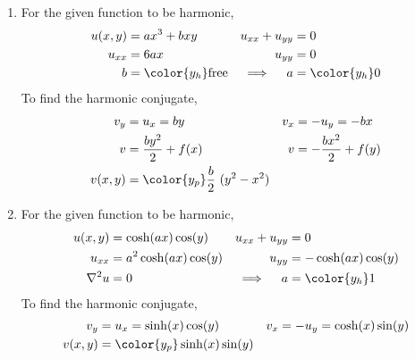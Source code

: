 \begin{enumerate}
    \item For the given function to be harmonic,
          \begin{align}
              u(x, y)          & = ax^3 + bxy              &
              u_{xx} + u_{yy}  & = 0                         \\
              u_{xx}           & = 6ax                     &
              u_{yy}           & = 0                         \\
              b                & = \color{y_h} \text{free} &
              \implies \quad a & = \color{y_h} 0
          \end{align}
          To find the harmonic conjugate,
          \begin{align}
              v_y     & = u_x = by                             &
              v_x     & = -u_y = -bx                             \\
              v       & = \frac{by^2}{2} + f(x)                &
              v       & = -\frac{bx^2}{2} + f(y)                 \\
              v(x, y) & = \color{y_p} \frac{b}{2}\ (y^2 - x^2)
          \end{align}

    \item For the given function to be harmonic,
          \begin{align}
              u(x, y)          & = \cosh(ax) \cos(y)    &
              u_{xx} + u_{yy}  & = 0                      \\
              u_{xx}           & = a^2\cosh(ax) \cos(y) &
              u_{yy}           & = -\cosh(ax) \cos(y)     \\
              \nabla^2 u       & = 0                    &
              \implies \quad a & = \color{y_h} 1
          \end{align}
          To find the harmonic conjugate,
          \begin{align}
              v_y     & = u_x = \sinh(x) \cos(y)       &
              v_x     & = -u_y = \cosh(x)\sin(y)         \\
              v(x, y) & = \color{y_p} \sinh(x) \sin(y)
          \end{align}


\end{enumerate}
